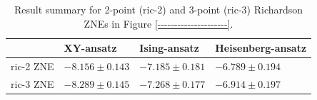 \begin{table}[h]
\caption{Result summary for 2-point (ric-2) and 3-point (ric-3) Richardson ZNEs in Figure \ref{---------------------}.}
\begin{tabular}{@{}llll@{}}
\toprule
  & XY-ansatz  & Ising-ansatz  & Heisenberg-ansatz\\
\midrule
ric-2 ZNE & $-8.156 \pm 0.143$ & $-7.185 \pm 0.181$ & $-6.789 \pm 0.194$ \\
ric-3 ZNE & $-8.289 \pm 0.145$ & $-7.268 \pm 0.177$ & $-6.914 \pm 0.197$ \\
\bottomrule
\end{tabular}
\label{table-dephasing-noise-free-time-evo}
\end{table}
